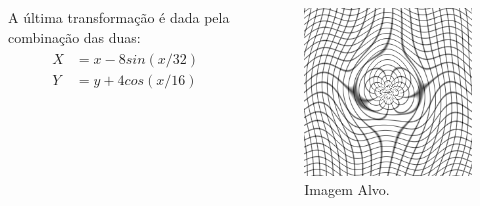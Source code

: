 \documentclass[t]{beamer}
\begin{document}
\begin{frame}
   \begin{columns}[c]
        A última transformação é dada pela combinação das duas:
        \begin{align}
        \begin{split}
            X &= x - 8sin(x/32) \\
            Y &= y + 4cos(x/16)
        \end{split} 
        \end{align}
        \begin{figure}[!h]
          \begin{center}
            \includegraphics[width=1.0\textwidth]{../images/movingImageDistSin.png}
            \caption{Imagem Alvo.}
          \end{center}
        \end{figure}
    \end{columns}
\end{frame}
\end{document}
